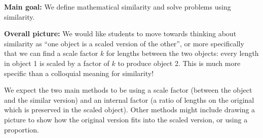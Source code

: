 \documentclass[noauthor,nooutcomes]{ximera}
\begin{document}
\newpage

\begin{instructorNotes}
{\bf Main goal:} We define mathematical similarity and solve problems using similarity.

{\bf Overall picture:} We would like students to move towards thinking about similarity as ``one object is a scaled version of the other'', or more specifically that we can find a scale factor $k$ for lengths between the two objects: every length in object 1 is scaled by a factor of $k$ to produce object 2. This is much more specific than a colloquial meaning for similarity!

We expect the two main methods to be using a scale factor (between the object and the similar version) and an internal factor (a ratio of lengths on the original which is preserved in the scaled object). Other methods might include drawing a picture to show how the original version fits into the scaled version, or using a proportion. 


\end{instructorNotes}
\end{document}
